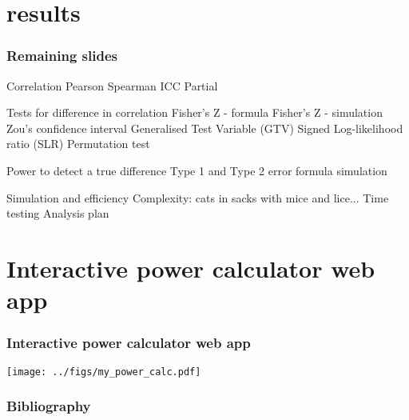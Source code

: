 \documentclass{beamer}
\begin{document}
  \section{results}

  \begin{frame}
    \frametitle{Remaining slides}

  Correlation
  Pearson
  Spearman
  ICC
  Partial
  
  Tests for difference in correlation
  Fisher's Z - formula
  Fisher's Z - simulation
  Zou's confidence interval
  Generalised Test Variable (GTV)
  Signed Log-likelihood ratio (SLR)
  Permutation test
  
  Power to detect a true difference
  Type 1 and Type 2 error
  formula
  simulation
  
  Simulation and efficiency
  Complexity: cats in sacks with mice and lice...
  Time testing
  Analysis plan
  \end{frame}    
  
  
  
  \section{Interactive power calculator web app} 
  \begin{frame}
    \frametitle{Interactive power calculator web app}
    \begin{center}
      \texttt{[image: ../figs/my\_power\_calc.pdf]}
    \end{center}
  \end{frame}    
  
  \begin{frame}[allowframebreaks]
    \frametitle{Bibliography}
    \printbibliography
  \end{frame}
  
\end{document}
